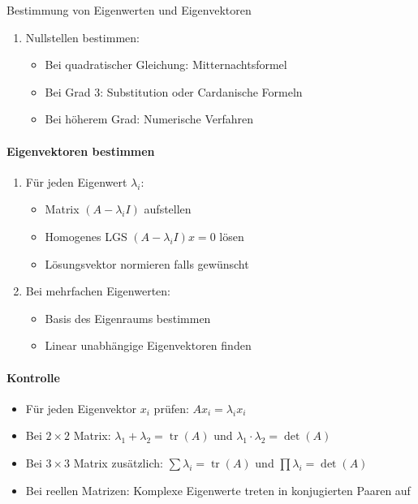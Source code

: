 \begin{KR}{Bestimmung von Eigenwerten und Eigenvektoren}
\begin{enumerate}
    \item Nullstellen bestimmen:
    \begin{itemize}
        \item Bei quadratischer Gleichung: Mitternachtsformel
        \item Bei Grad 3: Substitution oder Cardanische Formeln
        \item Bei höherem Grad: Numerische Verfahren
    \end{itemize}
\end{enumerate}

\paragraph{Eigenvektoren bestimmen}
\begin{enumerate}
    \item Für jeden Eigenwert $\lambda_i$:
    \begin{itemize}
        \item Matrix $(A - \lambda_i I)$ aufstellen
        \item Homogenes LGS $(A - \lambda_i I)x = 0$ lösen
        \item Lösungsvektor normieren falls gewünscht
    \end{itemize}

    \item Bei mehrfachen Eigenwerten:
    \begin{itemize}
        \item Basis des Eigenraums bestimmen
        \item Linear unabhängige Eigenvektoren finden
    \end{itemize}
\end{enumerate}

\paragraph{Kontrolle}
\begin{itemize}
    \item Für jeden Eigenvektor $x_i$ prüfen: $Ax_i = \lambda_i x_i$
    \item Bei $2 \times 2$ Matrix: $\lambda_1 + \lambda_2 = \operatorname{tr}(A)$ und $\lambda_1 \cdot \lambda_2 = \det(A)$
    \item Bei $3 \times 3$ Matrix zusätzlich: $\sum \lambda_i = \operatorname{tr}(A)$ und $\prod \lambda_i = \det(A)$
    \item Bei reellen Matrizen: Komplexe Eigenwerte treten in konjugierten Paaren auf
\end{itemize}


\end{KR}
